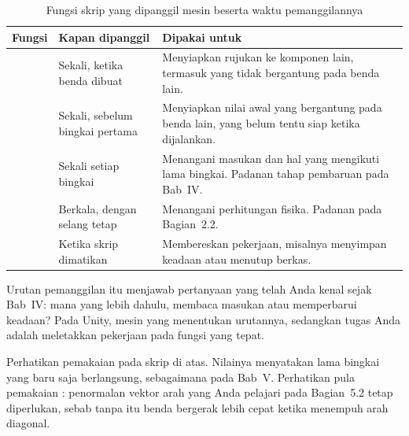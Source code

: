 \begin{table}[htbp]
\centering
\caption{Fungsi skrip yang dipanggil mesin beserta waktu pemanggilannya}
\label{tab-daur-hidup}
{\setlength{\tabcolsep}{4pt}\footnotesize%
\begin{tabularx}{\textwidth}{@{}L{3.0cm} L{3.4cm} Y@{}}
\toprule
\headrow \textbf{Fungsi} & \textbf{Kapan dipanggil} & \textbf{Dipakai untuk} \\
\midrule
{} & Sekali, ketika benda dibuat &
Menyiapkan rujukan ke komponen lain, termasuk yang tidak bergantung pada benda
lain. \\
\addlinespace
{} & Sekali, sebelum bingkai pertama &
Menyiapkan nilai awal yang bergantung pada benda lain, yang belum tentu siap
ketika  dijalankan. \\
\addlinespace
{} & Sekali setiap bingkai &
Menangani masukan dan hal yang mengikuti lama bingkai. Padanan tahap pembaruan
pada Bab~IV. \\
\addlinespace
{} & Berkala, dengan selang tetap &
Menangani perhitungan fisika. Padanan  pada Bagian~2.2. \\
\addlinespace
{} & Ketika skrip dimatikan &
Membereskan pekerjaan, misalnya menyimpan keadaan atau menutup berkas. \\
\bottomrule
\end{tabularx}}
\end{table}

Urutan pemanggilan itu menjawab pertanyaan yang telah Anda
kenal sejak Bab~IV: mana yang lebih dahulu, membaca masukan atau memperbarui
keadaan? Pada Unity, mesin yang menentukan urutannya, sedangkan tugas Anda
adalah meletakkan pekerjaan pada fungsi yang tepat.

\begin{catatabox}
Perhatikan pemakaian  pada skrip di atas. Nilainya
menyatakan lama bingkai yang baru saja berlangsung, sebagaimana
 pada Bab~V. Perhatikan pula pemakaian
: penormalan vektor arah yang Anda pelajari pada
Bagian~5.2 tetap diperlukan, sebab tanpa itu benda bergerak lebih cepat ketika
menempuh arah diagonal.
\end{catatabox}
